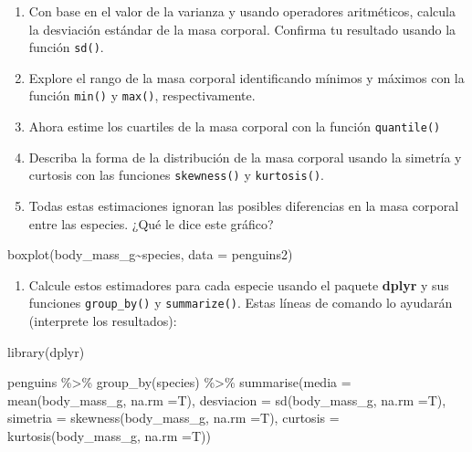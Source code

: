 \documentclass[
  letterpaper,
  DIV=11,
  numbers=noendperiod]{scrartcl}
\newenvironment{Shaded}{\begin{snugshade}}{\end{snugshade}}
\newcommand{\AttributeTok}[1]{\textcolor[rgb]{0.40,0.45,0.13}{#1}}
\newcommand{\FunctionTok}[1]{\textcolor[rgb]{0.28,0.35,0.67}{#1}}
\newcommand{\NormalTok}[1]{\textcolor[rgb]{0.00,0.23,0.31}{#1}}
\newcommand{\SpecialCharTok}[1]{\textcolor[rgb]{0.37,0.37,0.37}{#1}}
\providecommand{\tightlist}{%
  \setlength{\itemsep}{0pt}\setlength{\parskip}{0pt}}\usepackage{longtable,booktabs,array}
\begin{document}
\begin{enumerate}
\def\labelenumi{\arabic{enumi}.}
\setcounter{enumi}{5}
\item
  Con base en el valor de la varianza y usando operadores aritméticos,
  calcula la desviación estándar de la masa corporal. Confirma tu
  resultado usando la función \texttt{sd()}.
\item
  Explore el rango de la masa corporal identificando mínimos y máximos
  con la función \texttt{min()} y \texttt{max()}, respectivamente.
\item
  Ahora estime los cuartiles de la masa corporal con la función
  \texttt{quantile()}
\item
  Describa la forma de la distribución de la masa corporal usando la
  simetría y curtosis con las funciones \texttt{skewness()} y
  \texttt{kurtosis()}.
\item
  Todas estas estimaciones ignoran las posibles diferencias en la masa
  corporal entre las especies. ¿Qué le dice este gráfico?
\end{enumerate}

\begin{Shaded}
\begin{Highlighting}[]
\FunctionTok{boxplot}\NormalTok{(body\_mass\_g}\SpecialCharTok{\textasciitilde{}}\NormalTok{species, }\AttributeTok{data =}\NormalTok{ penguins2)}
\end{Highlighting}
\end{Shaded}

\begin{enumerate}
\def\labelenumi{\arabic{enumi}.}
\setcounter{enumi}{10}
\tightlist
\item
  Calcule estos estimadores para cada especie usando el paquete
  \textbf{dplyr} y sus funciones \texttt{group\_by()} y
  \texttt{summarize()}. Estas líneas de comando lo ayudarán (interprete
  los resultados):
\end{enumerate}

\begin{Shaded}
\begin{Highlighting}[]
\FunctionTok{library}\NormalTok{(dplyr)}

\NormalTok{penguins }\SpecialCharTok{\%\textgreater{}\%} 
  \FunctionTok{group\_by}\NormalTok{(species) }\SpecialCharTok{\%\textgreater{}\%} 
  \FunctionTok{summarise}\NormalTok{(}\AttributeTok{media =} \FunctionTok{mean}\NormalTok{(body\_mass\_g, }\AttributeTok{na.rm =}\NormalTok{T),}
            \AttributeTok{desviacion =} \FunctionTok{sd}\NormalTok{(body\_mass\_g, }\AttributeTok{na.rm =}\NormalTok{T),}
            \AttributeTok{simetria =} \FunctionTok{skewness}\NormalTok{(body\_mass\_g, }\AttributeTok{na.rm =}\NormalTok{T),}
            \AttributeTok{curtosis =} \FunctionTok{kurtosis}\NormalTok{(body\_mass\_g, }\AttributeTok{na.rm =}\NormalTok{T))}
\end{Highlighting}
\end{Shaded}
\end{document}
